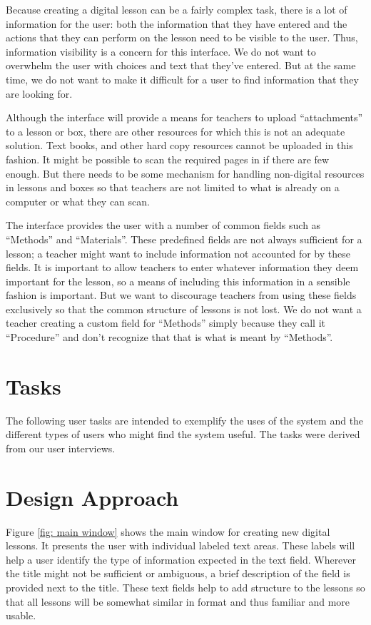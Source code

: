 \documentclass[10pt,letter]{article}
\begin{document}
Because creating a digital lesson can be a fairly complex task, there is a lot
of information for the user: both the information that they have entered and the
actions that they can perform on the lesson need to be visible to the user.
Thus, information visibility is a concern for this interface. We do not want to
overwhelm the user with choices and text that they've entered. But at the same
time, we do not want to make it difficult for a user to find information that
they are looking for.

Although the interface will provide a means for teachers to upload
``attachments'' to a lesson or box, there are other resources for which this is
not an adequate solution. Text books, and other hard copy resources cannot be
uploaded in this fashion. It might be possible to scan the required pages in if
there are few enough. But there needs to be some mechanism for handling
non-digital resources in lessons and boxes so that teachers are not limited to
what is already on a computer or what they can scan.

The interface provides the user with a number of common fields such as
``Methods'' and ``Materials''. These predefined fields are not always sufficient
for a lesson; a teacher might want to include information not accounted for by
these fields. It is important to allow teachers to enter whatever information
they deem important for the lesson, so a means of including this information in
a sensible fashion is important.  But we want to discourage teachers from using
these fields exclusively so that the common structure of lessons is not lost. We
do not want a teacher creating a custom field for ``Methods'' simply because
they call it ``Procedure'' and don't recognize that that is what is meant by
``Methods''.

\section{Tasks}
The following user tasks are intended to exemplify the uses of the system and
the different types of users who might find the system useful. The tasks were
derived from our user interviews.



\section{Design Approach}
Figure \ref{fig: main window} shows the main window for creating new digital
lessons. It presents the user with individual labeled text areas. These labels
will help a user identify the type of information expected in the text field.
Wherever the title might not be sufficient or ambiguous, a brief description of
the field is provided next to the title. These text fields help to add
structure to the lessons so that all lessons will be somewhat similar in format
and thus familiar and more usable.
\end{document}
